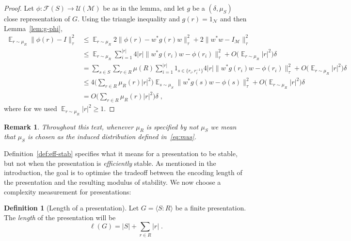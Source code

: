 \documentclass[11pt]{article}
\newtheorem{remark}[theorem]{Remark}
\theoremstyle{definition}
\newtheorem{definition}[theorem]{Definition}
\newcommand{\Id}{\ensuremath{I}}
\DeclareMathOperator*{\Expectation}{\mathbb{E}}
\newcommand{\Es}[1]{\Expectation_{#1}}
\newcommand{\mM}{\ensuremath{\mathcal{M}}}
\newcommand{\cM}{\ensuremath{\mathcal{M}}}
\newcommand{\mN}{\mathcal{N}}
\begin{document}
  \begin{proof}
    Let $\phi:\mathcal{F}(S)\to \mathcal{U}(\cM)$ be as in the lemma, and let $g$ be a $(\delta,\mu_S)$ close representation of $G$.
   Using the triangle inequality and $g(r)=1_\mN$ and then Lemma~\ref{lem:g-phi}, 
  \begin{align*}
  \Es{r\sim \mu_R}\|\phi(r)-\Id\|_\tau^2 &\leq \Es{r\sim \mu_R} 2\|\phi(r)-w^*g(r)w\|^2_\tau + 2\|w^*w-I_\mM\|^2_\tau\\
  &\leq \Es{r\sim \mu_R}\sum_{i=1}^{|r|}4|r|\| w^* g(r_i)w -\phi(r_i)\|_\tau^2 + O\Big(\Es{r\sim \mu_R}|r|^2\Big)\delta \\
  &=  \sum_{s\in S} \sum_{r\in R} \mu(R) \sum_{i=1}^{|r|} 1_{s\in \{r_i,r_i^{-1}\}} 4|r|\| w^* g(r_i)w -\phi(r_i)\|_\tau^2 +  O\Big(\Es{r\sim \mu_R}|r|^2\Big)\delta \\
  &\leq 4\Big(\sum_{r\in R} \mu_R(r)|r|^2\Big)\Es{s\sim \mu_S } \| w^* g(s)w -\phi(s)\|_\tau^2 +   O\Big(\Es{r\sim \mu_R}|r|^2\Big)\delta \\
  &=  O\Big(\sum_{r\in R} \mu_R(r)|r|^2\Big)\delta\;,
  \end{align*}
  where 
	for we used $\Es{r\sim \mu_R}|r|^2\geq 1$. 
  \end{proof}
  
\begin{remark}\label{rk-mus}
  Throughout this text, whenever $\mu_R$ is specified by not $\mu_S$ we mean that $\mu_S$ is chosen as the induced distribution defined in~\eqref{eq:mus}.
\end{remark}

Definition~\ref{def:eff-stab} specifies what it means for a presentation to be stable, but not when the presentation is \emph{efficiently} stable. 
As mentioned in the introduction, the goal is to optimise the tradeoff between the encoding length of the presentation and the resulting modulus of stability. We now choose a complexity measurement for presentations:
\begin{definition}[Length of a presentation]\label{def:length_of_pres}
    Let $G=\langle S\colon R\rangle$ be a finite presentation. The \emph{length} of the presentation  will be  $$\ell(G)=|S|+ \sum_{r\in R}|r|\;.$$ 
\end{definition}
\end{document}
